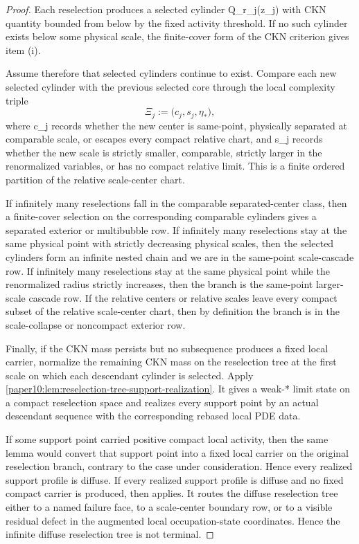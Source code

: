 \documentclass[11pt]{amsart}
\def\({}%
\def\){}%
\def\mathfrak#1{#1}%
\theoremstyle{plain}
\theoremstyle{definition}
\theoremstyle{remark}
\begin{document}
\begin{proof}
Each reselection produces a selected cylinder \(Q_{r_j}(z_j)\) with CKN
quantity bounded from below by the fixed activity threshold.  If no such
cylinder exists below some physical scale, the finite-cover form of the CKN
criterion gives item \textup{(i)}.

Assume therefore that selected cylinders continue to exist.  Compare each new
selected cylinder with the previous selected core through the local complexity
triple
\[
  \Xi_j
  :=
  \bigl(\mathfrak c_j,\mathfrak s_j,\eta_*\bigr),
\]
where \(\mathfrak c_j\) records whether the new center is same-point,
physically separated at comparable scale, or escapes every compact relative
chart, and \(\mathfrak s_j\) records whether the new scale is strictly smaller,
comparable, strictly larger in the renormalized variables, or has no compact
relative limit.  This is a finite ordered partition of the relative
scale-center chart.

If infinitely many reselections fall in the comparable separated-center class,
then a finite-cover selection on the corresponding comparable cylinders gives a
separated exterior or multibubble row.  If infinitely many reselections stay at
the same physical point with strictly decreasing physical scales, then the
selected cylinders form an infinite nested chain and we are in the same-point
scale-cascade row.  If infinitely many reselections stay at the same physical
point while the renormalized radius strictly increases, then the branch is the
same-point larger-scale cascade row.  If the relative centers or relative
scales leave every compact subset of the relative scale-center chart, then by
definition the branch is in the scale-collapse or noncompact exterior row.

Finally, if the CKN mass persists but no subsequence produces a fixed local
carrier, normalize the remaining CKN mass on the reselection tree at the first
scale on which each descendant cylinder is selected.  Apply
\cref{paper10:lem:reselection-tree-support-realization}.  It gives a weak-* limit
state on a compact reselection space and realizes every support point by an
actual descendant sequence with the corresponding rebased local PDE data.

If some support point carried positive compact local activity, then the same
lemma would convert that support point into a fixed local carrier on the
original reselection branch, contrary to the case under consideration.  Hence
every realized support profile is diffuse.  If every realized support profile
is diffuse and no fixed compact carrier is produced, then
 applies.  It routes the
diffuse reselection tree either to a named failure face, to a scale-center
boundary row, or to a visible residual defect in the augmented local
occupation-state coordinates.  Hence the infinite diffuse reselection tree is
not terminal.
\end{proof}
\end{document}
